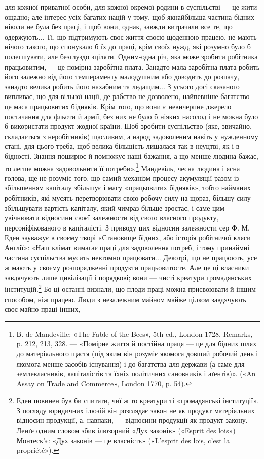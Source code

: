 \parcont{}  %
для кожної приватної особи, для кожної окремої родини в суспільстві
— це жити ощадно; але інтерес усіх багатих націй у
тому, щоб якнайбільша частина бідних ніколи не була без праці,
і щоб вони, однак, завжди витрачали все те, що одержують...
Ті, що підтримують своє життя своєю щоденною працею, не
мають нічого такого, що спонукало б їх до праці, крім своїх
нужд, які розумно було б полегшувати, але безглуздо зціляти.
Одним-одна річ, яка може зробити робітника працьовитим, —
це помірна заробітна плата. Занадто мала заробітна плата робить
його залежно від його темпераменту малодушним або доводить
до розпачу, занадто велика робить його нахабним та ледащим...
З усього досі сказаного випливає, що для вільної нації, де рабство
не дозволено, найпевніше багатство — це маса працьовитих бідняків.
Крім того, що вони є невичерпне джерело постачання для
фльоти й армії, без них не було б ніяких насолод і не можна
було б використати продукт жодної країни. Щоб зробити суспільство
(яке, звичайно, складається з неробітників) щасливим, а
народ задоволеним навіть у нужденному стані, для цього треба,
щоб велика більшість лишалася так в неуцтві, як і в бідності.
Знання поширює й помножує наші бажання, а що менше людина
бажає, то легше можна задовольнити її потреби».\footnote{
В. de Mandeville: «The Fable of the Bees», 5th ed., London 1728,
Remarks, p. 212, 213, 328. — «Помірне життя й постійна праця — це для
бідних шлях до матеріяльного щастя (під яким він розуміє якомога довший
робочий день і якомога менше засобів існування) і до багатства для
держави (а саме для землевласників, капіталістів та їхніх політичних
сановників і аґентів)». («An Assay on Trade and Commerce», London
1770, p. 54).
} Мандевіль,
чесна людина і ясна голова, ще не розуміє того, що самий механізм
процесу акумуляції разом із збільшенням капіталу збільшує
і масу «працьовитих бідняків», тобто найманих робітників,
які мусять перетворювати свою робочу силу на щораз, більшу
силу збільшувати вартість капіталу, який чимраз більше зростає,
і саме цим увічнювати відносини своєї залежности від
свого власного продукту, персоніфікованого в капіталісті. З приводу
цих відносин залежности сер Ф. М. Еден зауважує в своєму
творі «Становище бідних, або історія робітничої кляси Англії»:
«Наш клімат вимагає праці для задоволення потреб, і тому
принаймні частина суспільства мусить невтомно працювати...
Декотрі, що не працюють, усе ж мають у своєму розпорядженні
продукти працьовитосте. Але це ці власники завдячують лише
цивілізації і порядкові; вони — чисті креатури громадянських
інституцій.\footnote{
Еден повинен був би спитати, чиї ж то креатури ті «громадянські
інституції». З погляду юридичних ілюзій він розглядає закон не як
продукт матеріяльних відносин продукції, а, навпаки, — відносини продукції
як продукт закону. Ленґе одним словом збив ілюзорний «Дух
законів» («Esprit des lois») Монтеск’є: «Дух законів — це власність»
(«L’esprit des lois, c’est la propriété»).
} Бо ці останні визнали, що плоди праці можна
присвоювати й іншим способом, ніж працею. Люди з незалежним
майном майже цілком завдячують своє майно праці інших,
\parbreak{}  %
